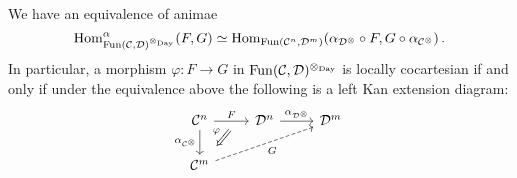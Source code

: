 \begin{lem}
	We have an equivalence of animae
	\begin{equation*}
		\Hom_{\Fun(\Cc,\Dd)^{\otimes_{\mathrm{Day}}}}^\alpha(F,G)\simeq \Hom_{\Fun(\Cc^n,\Dd^m)}\left(\alpha_{\Dd^\otimes}\circ F,G\circ \alpha_{\Cc^\otimes}\right)\,.
	\end{equation*}
	In particular, a morphism $\varphi\colon F\rightarrow G$ in $\operatorname{Fun}(\mathcal{C},\mathcal{D})^{\otimes_{\mathrm{Day}}}$ is locally cocartesian if and only if under the equivalence above the following is a left Kan extension diagram:
	\begin{equation*}
		\begin{tikzcd}
			\Cc^n\rar["F",""{sloped,name=A,pos=0.75}]\arrow[from=A,to=2-1,draw=none,"\Longleftarrow"{sloped,marking},"\varphi"']\dar["\alpha_{\Cc^\otimes}"'] & \Dd^n\rar["\alpha_{\Dd^\otimes}"] & \Dd^m\\
			\Cc^m\ar[urr,dashed,"G"']
		\end{tikzcd}
	\end{equation*}
\end{lem}

